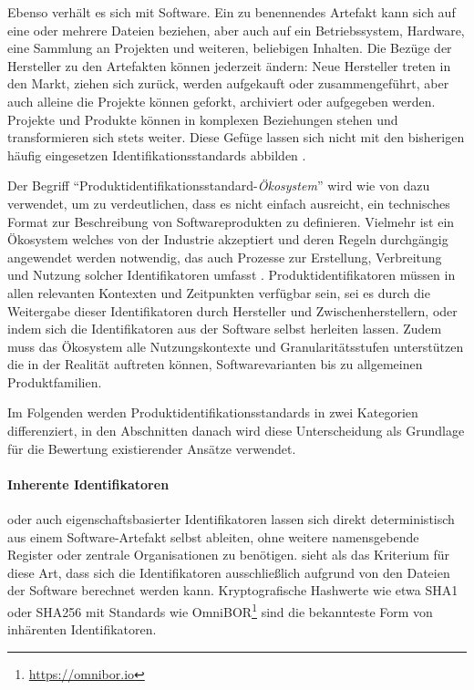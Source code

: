 Ebenso verhält es sich mit Software.
Ein zu benennendes Artefakt kann sich auf eine oder mehrere Dateien beziehen, aber auch auf ein Betriebssystem, Hardware, eine Sammlung an Projekten und weiteren, beliebigen Inhalten.
Die Bezüge der Hersteller zu den Artefakten können jederzeit ändern:
Neue Hersteller treten in den Markt, ziehen sich zurück, werden aufgekauft oder zusammengeführt, aber auch alleine die Projekte können geforkt, archiviert oder aufgegeben werden.
Projekte und Produkte können in komplexen Beziehungen stehen und transformieren sich stets weiter.
Diese Gefüge lassen sich nicht mit den bisherigen häufig eingesetzen Identifikationsstandards abbilden \autocite{Manion_Proell_Schmidt2023}.

Der Begriff \enquote{Produktidentifikationsstandard-\textit{Ökosystem}} wird wie von \citeauthor{CISA2023} dazu verwendet, um zu verdeutlichen, dass es nicht einfach ausreicht, ein technisches Format zur Beschreibung von Softwareprodukten zu definieren.
Vielmehr ist ein Ökosystem welches von der Industrie akzeptiert und deren Regeln durchgängig angewendet werden notwendig, das auch Prozesse zur Erstellung, Verbreitung und Nutzung solcher Identifikatoren umfasst \autocite{CISA2023}.
Produktidentifikatoren müssen in allen relevanten Kontexten und Zeitpunkten verfügbar sein, sei es durch die Weitergabe dieser Identifikatoren durch Hersteller und Zwischenherstellern, oder indem sich die Identifikatoren aus der Software selbst herleiten lassen.
Zudem muss das Ökosystem alle Nutzungskontexte und Granularitätsstufen unterstützen die in der Realität auftreten können, Softwarevarianten bis zu allgemeinen Produktfamilien.

Im Folgenden werden Produktidentifikationsstandards in zwei Kategorien differenziert, in den Abschnitten danach wird diese Unterscheidung als Grundlage für die Bewertung existierender Ansätze verwendet.

\paragraph{Inherente Identifikatoren} %
oder auch eigenschaftsbasierter Identifikatoren lassen sich direkt deterministisch aus einem Software-Artefakt selbst ableiten, ohne weitere namensgebende Register oder zentrale Organisationen zu benötigen.
\citeauthor{CISA2023} sieht als das Kriterium für diese Art, dass sich die Identifikatoren ausschließlich aufgrund von den Dateien der Software berechnet werden kann.
Kryptografische Hashwerte wie etwa SHA1 oder SHA256 mit Standards wie OmniBOR\footnote{\url{https://omnibor.io}} sind die bekannteste Form von inhärenten Identifikatoren.


